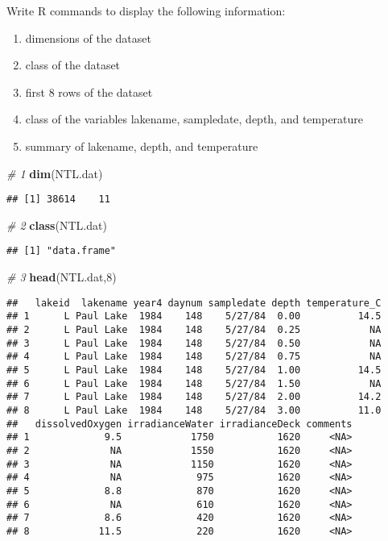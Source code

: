 \documentclass[]{article}
\newenvironment{Shaded}{\begin{snugshade}}{\end{snugshade}}
\newcommand{\KeywordTok}[1]{\textcolor[rgb]{0.13,0.29,0.53}{\textbf{#1}}}
\newcommand{\DecValTok}[1]{\textcolor[rgb]{0.00,0.00,0.81}{#1}}
\newcommand{\CommentTok}[1]{\textcolor[rgb]{0.56,0.35,0.01}{\textit{#1}}}
\newcommand{\NormalTok}[1]{#1}
\providecommand{\tightlist}{%
  \setlength{\itemsep}{0pt}\setlength{\parskip}{0pt}}
\begin{document}
Write R commands to display the following information:

\begin{enumerate}
\def\labelenumi{\arabic{enumi}.}
\tightlist
\item
  dimensions of the dataset
\item
  class of the dataset
\item
  first 8 rows of the dataset
\item
  class of the variables lakename, sampledate, depth, and temperature
\item
  summary of lakename, depth, and temperature
\end{enumerate}

\begin{Shaded}
\begin{Highlighting}[]
\CommentTok{# 1}
\KeywordTok{dim}\NormalTok{(NTL.dat)}
\end{Highlighting}
\end{Shaded}

\begin{verbatim}
## [1] 38614    11
\end{verbatim}

\begin{Shaded}
\begin{Highlighting}[]
\CommentTok{# 2}
\KeywordTok{class}\NormalTok{(NTL.dat)}
\end{Highlighting}
\end{Shaded}

\begin{verbatim}
## [1] "data.frame"
\end{verbatim}

\begin{Shaded}
\begin{Highlighting}[]
\CommentTok{# 3}
\KeywordTok{head}\NormalTok{(NTL.dat,}\DecValTok{8}\NormalTok{)}
\end{Highlighting}
\end{Shaded}

\begin{verbatim}
##   lakeid  lakename year4 daynum sampledate depth temperature_C
## 1      L Paul Lake  1984    148    5/27/84  0.00          14.5
## 2      L Paul Lake  1984    148    5/27/84  0.25            NA
## 3      L Paul Lake  1984    148    5/27/84  0.50            NA
## 4      L Paul Lake  1984    148    5/27/84  0.75            NA
## 5      L Paul Lake  1984    148    5/27/84  1.00          14.5
## 6      L Paul Lake  1984    148    5/27/84  1.50            NA
## 7      L Paul Lake  1984    148    5/27/84  2.00          14.2
## 8      L Paul Lake  1984    148    5/27/84  3.00          11.0
##   dissolvedOxygen irradianceWater irradianceDeck comments
## 1             9.5            1750           1620     <NA>
## 2              NA            1550           1620     <NA>
## 3              NA            1150           1620     <NA>
## 4              NA             975           1620     <NA>
## 5             8.8             870           1620     <NA>
## 6              NA             610           1620     <NA>
## 7             8.6             420           1620     <NA>
## 8            11.5             220           1620     <NA>
\end{verbatim}
\end{document}
